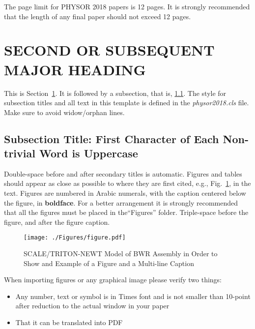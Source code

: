 \documentclass[letterpaper]{physor2018}
\begin{document}
The page limit for PHYSOR 2018 papers is 12 pages. It is strongly recommended that
the length of any final paper should not exceed 12 pages.

\section{SECOND OR SUBSEQUENT MAJOR HEADING}
\label{sec:first}

This is Section~\ref{sec:first}. It is followed by a subsection, that is,
\ref{sec:second}. The style for subsection titles and all text in this template is defined
in the \emph{physor2018.cls} file.  Make sure to avoid widow/orphan lines.

\subsection{Subsection Title: First Character of Each Non-trivial Word is Uppercase}
\label{sec:second}

Double-space before and after secondary titles is automatic.  Figures and
tables should appear as close as possible to where they are first
cited, e.g., Fig.~\ref{fig:amdahl}, in the text.  Figures are numbered in Arabic
numerals, with the caption centered below the figure, in \textbf{boldface}. For a better
arrangement it is strongly recommended that all the figures must be placed in the``Figures''
folder. Triple-space before the figure, and after the figure caption.

\begin{figure}[!htb]
  \centering
  \texttt{[image: ./Figures/figure.pdf]}
  \caption{SCALE/TRITON-NEWT Model of BWR Assembly in Order to Show and Example of a Figure and a Multi-line Caption}
  \label{fig:amdahl}
\end{figure}

When importing figures or any graphical image please verify two things:
\vspace{-0.65cm} %
\begin{itemize} \itemsep1pt \parskip0pt 
\item Any number, text or symbol is in Times font and is not smaller than
  10-point after reduction to the actual window in your paper
\item That it can be translated into PDF
\end{itemize}
\end{document}
